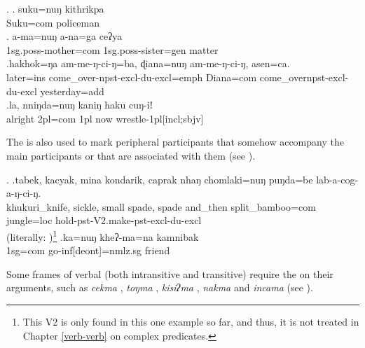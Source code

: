 \ex. \ag.  suku=nuŋ   kithrikpa\\
Suku{\sc =com} policeman\\
 
		\bg. a-ma=nuŋ  a-na=ga ceʔya\\
{\sc 1sg.poss-}mother{\sc=com} {\sc 1sg.poss-}sister{\sc=gen} matter\\
		\bg.hakhok=ŋa  am-me-ŋ-ci-ŋ=ba, ɖiana=nuŋ     am-me-ŋ-ci-ŋ, asen=ca.\\
		later{\sc =ins} come\_over{\sc -npst-excl-du-excl=emph} Diana{\sc =com} come\_over{\sc npst-excl-du-excl} yesterday{\sc =add}\\
		\bg.la,    nniŋda=nuŋ   kaniŋ haku cuŋ-iǃ\\
		alright {\sc 2pl=com} {\sc 1pl} now wrestle{\sc -1pl[incl;sbjv]}\\
			
The  is also used to mark peripheral participants that somehow accompany the main participants or that are associated with them (see \Next).

\ex. \ag.tabek,                 kacyak, mina  kondarik,               caprak                 nhaŋ    chomlaki=nuŋ       puŋda=be    lab-a-cog-a-ŋ-ci-ŋ.\\
khukuri\_knife, sickle, small spade, spade and\_then split\_bamboo{\sc =com}  jungle{\sc =loc} hold{\sc -pst-V2.make-pst-excl-du-excl}\\
 (literally: )\footnote{This V2 is only found in this one example so far, and thus, it is not treated in Chapter \ref{verb-verb} on complex predicates.} 
\bg.ka=nuŋ kheʔ-ma=na kamnibak\\
{\sc 1sg=com} go{\sc -inf[deont]=nmlz.sg} friend\\
		
Some frames of verbal  (both intransitive and transitive) require the  on their arguments, such as \emph{cekma} , \emph{toŋma} , \emph{kisiʔma} , \emph{nakma}  and \emph{incama}  (see \Next).	
\largerpage	
				
